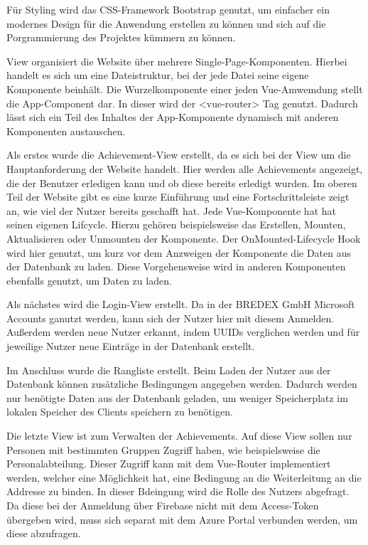 \documentclass[12pt]{article}
\begin{document}
Für Styling wird das CSS-Framework Bootstrap genutzt, um einfacher ein modernes
Design für die Anwendung erstellen zu können und sich auf die Porgrammierung des
Projektes kümmern zu können.

View organisiert die Website über mehrere Single-Page-Komponenten. Hierbei handelt
es sich um eine Dateistruktur, bei der jede Datei seine eigene Komponente beinhält.
Die Wurzelkomponente einer jeden Vue-Amwemdung stellt die App-Component dar. In dieser
wird der <vue-router> Tag genutzt. Dadurch lässt sich ein Teil des Inhaltes der App-Komponente
dynamisch mit anderen Komponenten austauschen.

Als erstes wurde die Achievement-View erstellt, da es sich bei der View um die
Hauptanforderung der Website handelt. Hier werden alle Achievements angezeigt, die
der Benutzer erledigen kann und ob diese bereits erledigt wurden.
Im oberen Teil der Website gibt es eine kurze Einführung und eine Fortschrittsleiste
zeigt an, wie viel der Nutzer bereits geschafft hat.
Jede Vue-Komponente hat
hat seinen eigenen Lifcycle. Hierzu gehören beispielsweise das Erstellen, Mounten,
Aktualisieren oder Unmounten der Komponente. Der OnMounted-Lifecycle Hook wird hier genutzt,
um kurz vor dem Anzweigen der Komponente die Daten aus der Datenbank zu laden.
Diese Vorgehensweise wird in anderen Komponenten ebenfalls genutzt, um Daten zu laden. 

Als nächstes wird die Login-View erstellt. Da in der BREDEX GmbH Microsoft Accounts
ganutzt werden, kann sich der Nutzer hier mit diesem Anmelden. Außerdem werden neue Nutzer
erkannt, indem UUIDs verglichen werden und für jeweilige Nutzer neue Einträge in der
Datenbank erstellt.

Im Anschluss wurde die Rangliste erstellt. Beim Laden der Nutzer aus der Datenbank können
zusätzliche Bedingungen angegeben werden. Dadurch werden nur benötigte Daten aus der
Datenbank geladen, um weniger Speicherplatz im lokalen Speicher des Clients speichern zu benötigen.

Die letzte View ist zum Verwalten der Achievements. Auf diese View sollen nur Personen
mit bestimmten Gruppen Zugriff haben, wie beispielsweise die Personalabteilung. Dieser Zugriff
kann mit dem Vue-Router implementiert werden, welcher eine Möglichkeit hat, eine Bedingung
an die Weiterleitung an die Addresse zu binden. In dieser Bdeingung wird die Rolle des
Nutzers abgefragt. Da diese bei der Anmeldung über Firebase nicht mit dem Access-Token
übergeben wird, muss sich separat mit dem Azure Portal verbunden werden, um diese abzufragen.
\end{document}
